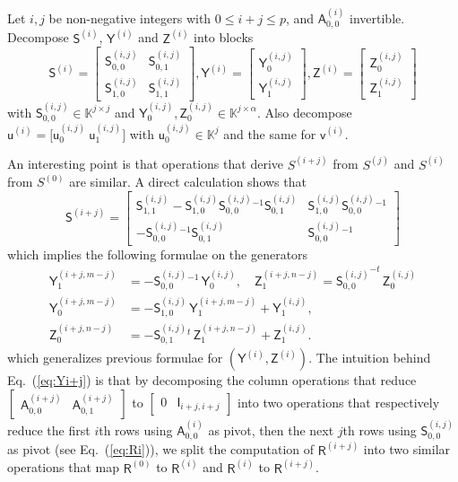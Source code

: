 \documentclass{sig-alternate}
\newcommand{\vu}{\ensuremath{\mathsf{u}}}
\newcommand{\vv}{\ensuremath{\mathsf{v}}}
\newcommand{\mA}{\ensuremath{\mathsf{A}}}
\newcommand{\mI}{\ensuremath{\mathsf{I}}}
\newcommand{\mR}{\ensuremath{\mathsf{R}}}
\newcommand{\mS}{\ensuremath{\mathsf{S}}}
\newcommand{\mY}{\ensuremath{\mathsf{Y}}}
\newcommand{\mZ}{\ensuremath{\mathsf{Z}}}
\newcommand{\K}{\ensuremath{\mathbb{K}}}
\begin{document}
Let $i,j$ be non-negative integers with $0 \le i+j \le p$, and
${\mA^{(i)}_{0,0}}$ invertible. Decompose $\mS^{(i)}$, $\mY^{(i)}$ and
$\mZ^{(i)}$ into blocks
\begin{equation*}
\mS^{(i)} = \begin{bmatrix} 
\mS^{(i,j)}_{0,0} & \mS^{(i,j)}_{0,1} \\
\mS^{(i,j)}_{1,0} & \mS^{(i,j)}_{1,1}
\end{bmatrix},  
\mY^{(i)} = 
\begin{bmatrix}
  \mY^{(i,j)}_0 \\\mY^{(i,j)}_1
\end{bmatrix},
\mZ^{(i)} = 
\begin{bmatrix}
  \mZ^{(i,j)}_0 \\\mZ^{(i,j)}_1
\end{bmatrix}
\end{equation*}
with $\mS^{(i,j)}_{0,0} \in \K^{j \times j}$ and
$\mY^{(i,j)}_0, \mZ^{(i,j)}_0 \in \K^{j \times \alpha}$. Also decompose 
%
$\vu^{(i)} = 
\big[ \vu^{(i,j)}_0 \  \vu^{(i,j)}_1 \big]
$ 
%
with $\vu^{(i,j)}_0 \in \K^j$ and the same for $\vv^{(i)}$.

An interesting point is that operations that derive $S^{(i+j)}$ from
$S^{(j)}$ and $S^{(i)}$ from $S^{(0)}$ are similar. A direct
calculation shows that
%
\begin{equation}
\label{eq:Si+j}
\mS^{(i+j)} = 
\begin{bmatrix} 
  \mS^{(i,j)}_{1,1} - \mS^{(i,j)}_{1,0} {\mS^{(i,j)}_{0,0}}{}^{-1} \mS^{(i,j)}_{0,1} 
  & 
  \mS^{(i,j)}_{1,0} {\mS^{(i,j)}_{0,0}}{}^{-1} 
  \\[1mm]
  -{\mS^{(i,j)}_{0,0}}{}^{-1} \mS^{(i,j)}_{0,1}
  &  
  {\mS^{(i,j)}_{0,0}}{}^{-1} 
\end{bmatrix}
\end{equation}
which implies the following formulae on the generators
\begin{align}
\mY^{(i+j,m-j)}_1&= -{\mS^{(i,j)}_{0,0}}{}^{-1} \,\mY^{(i,j)}_0,\quad
\mZ^{(i+j,n-j)}_1= {\mS^{(i,j)}_{0,0}}^{-t} \,\mZ^{(i,j)}_0 \nonumber\\
\mY^{(i+j,m-j)}_0&=-\mS^{(i,j)}_{1,0} \,\mY^{(i+j,m-j)}_1 + \mY^{(i,j)}_1,\label{eq:Yi+j}\\
\mZ^{(i+j,n-j)}_0&=-{\mS^{(i,j)}_{0,1}}{}^t \,\mZ^{(i+j,n-j)}_1 + \mZ^{(i,j)}_1 \nonumber.
\end{align}
%
which generalizes previous formulae for $(\mY^{(i)},\mZ^{(i)})$.  The
intuition behind Eq.~(\ref{eq:Yi+j}) is that by decomposing the
column operations that reduce
$\begin{bmatrix} \mA^{(i+j)}_{0,0} & \mA^{(i+j)}_{0,1} \end{bmatrix}$
to $\begin{bmatrix} 0 & \mI_{i+j,i+j} \end{bmatrix}$ into two
operations that respectively reduce the first $i$th rows using
$\mA^{(i)}_{0,0}$ as pivot, then the next $j$th rows using
$\mS^{(i,j)}_{0,0}$ as pivot (see Eq.~(\ref{eq:Ri})), we split the
computation of $\mR^{(i+j)}$ into two similar operations that map
$\mR^{(0)}$ to $\mR^{(i)}$ and $\mR^{(i)}$ to $\mR^{(i+j)}$.
\end{document}
